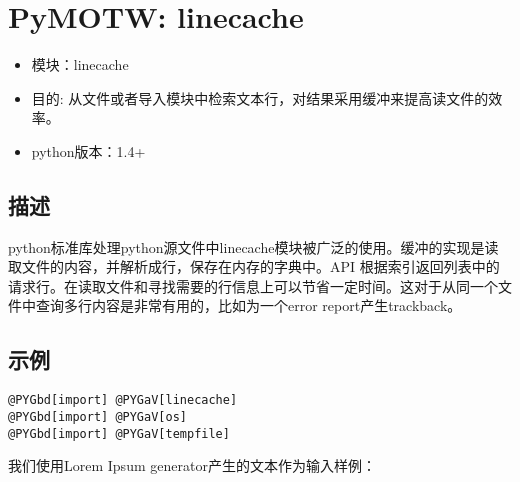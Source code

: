\documentclass[letterpaper,10pt,english]{manual}
\begin{document}
\resetcurrentobjects


\clearpage\section{PyMOTW: linecache}
\begin{itemize}
\item {} 
模块：linecache

\item {} 
目的: 从文件或者导入模块中检索文本行，对结果采用缓冲来提高读文件的效率。

\item {} 
python版本：1.4+

\end{itemize}


\subsection{描述}

python标准库处理python源文件中linecache模块被广泛的使用。缓冲的实现是读取文件的内容，并解析成行，保存在内存的字典中。API 根据索引返回列表中的请求行。在读取文件和寻找需要的行信息上可以节省一定时间。这对于从同一个文件中查询多行内容是非常有用的，比如为一个error report产生trackback。


\subsection{示例}

\begin{Verbatim}[commandchars=@\[\]]
@PYGbd[import] @PYGaV[linecache]
@PYGbd[import] @PYGaV[os]
@PYGbd[import] @PYGaV[tempfile]
\end{Verbatim}

我们使用Lorem Ipsum generator产生的文本作为输入样例：
\end{document}
